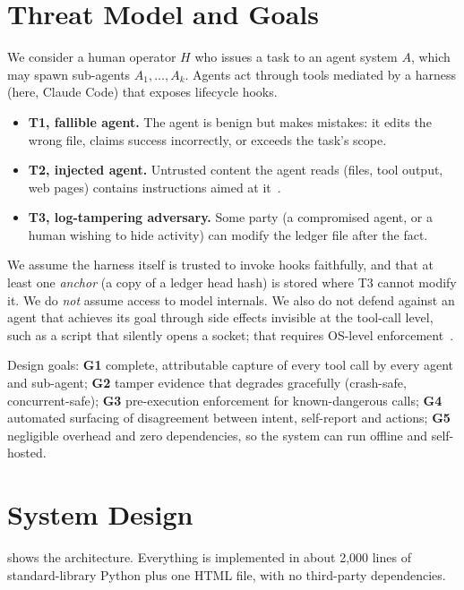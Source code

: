 \documentclass[11pt]{article}
\begin{document}
\section{Threat Model and Goals}\label{sec:threat}
We consider a human operator $H$ who issues a task to an agent system $A$, which may spawn sub-agents $A_1,\dots,A_k$. Agents act through tools mediated by a harness (here, Claude Code) that exposes lifecycle hooks.
\begin{itemize}[leftmargin=*,itemsep=1pt]
  \item \textbf{T1, fallible agent.} The agent is benign but makes mistakes: it edits the wrong file, claims success incorrectly, or exceeds the task's scope.
  \item \textbf{T2, injected agent.} Untrusted content the agent reads (files, tool output, web pages) contains instructions aimed at it~\cite{greshake2023indirect}.
  \item \textbf{T3, log-tampering adversary.} Some party (a compromised agent, or a human wishing to hide activity) can modify the ledger file after the fact.
\end{itemize}
We assume the harness itself is trusted to invoke hooks faithfully, and that at least one \emph{anchor} (a copy of a ledger head hash) is stored where T3 cannot modify it. We do \emph{not} assume access to model internals. We also do not defend against an agent that achieves its goal through side effects invisible at the tool-call level, such as a script that silently opens a socket; that requires OS-level enforcement~\cite{nono}.

Design goals: \textbf{G1} complete, attributable capture of every tool call by every agent and sub-agent; \textbf{G2} tamper evidence that degrades gracefully (crash-safe, concurrent-safe); \textbf{G3} pre-execution enforcement for known-dangerous calls; \textbf{G4} automated surfacing of disagreement between intent, self-report and actions; \textbf{G5} negligible overhead and zero dependencies, so the system can run offline and self-hosted.

\section{System Design}\label{sec:design}
 shows the architecture. Everything is implemented in about 2{,}000 lines of standard-library Python plus one HTML file, with no third-party dependencies.
\end{document}
